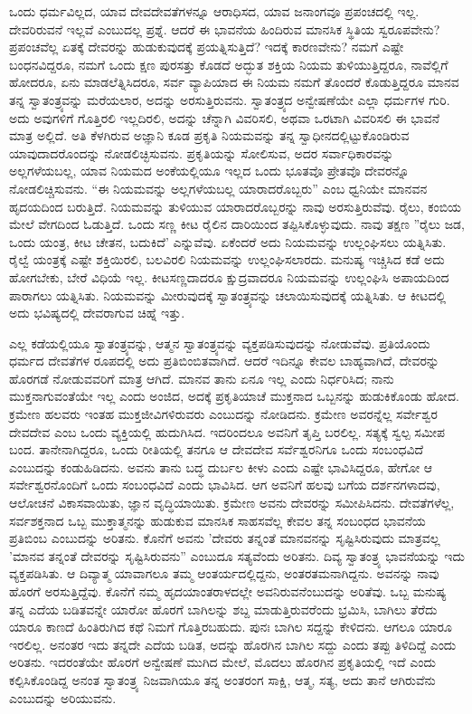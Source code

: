 ಒಂದು ಧರ್ಮವಿಲ್ಲದ, ಯಾವ ದೇವದೇವತೆಗಳನ್ನೂ ಆರಾಧಿಸದ, ಯಾವ ಜನಾಂಗವೂ ಪ್ರಪಂಚದಲ್ಲಿ ಇಲ್ಲ. ದೇವರಿರುವನೆ ಇಲ್ಲವೆ ಎಂಬುದಲ್ಲ ಪ್ರಶ್ನೆ. ಆದರೆ ಈ ಭಾವನೆಯ ಹಿಂದಿರುವ ಮಾನಸಿಕ ಸ್ಥಿತಿಯ ಸ್ವರೂಪವೇನು? ಪ್ರಪಂಚವೆಲ್ಲ ಏತಕ್ಕೆ ದೇವರನ್ನು ಹುಡುಕುವುದಕ್ಕೆ ಪ್ರಯತ್ನಿಸುತ್ತಿದೆ? ಇದಕ್ಕೆ ಕಾರಣವೇನು? ನಮಗೆ ಎಷ್ಟೇ ಬಂಧನವಿದ್ದರೂ, ನಮಗೆ ಒಂದು ಕ್ಷಣ ಪುರಸತ್ತು ಕೊಡದೆ ಅದ್ಭುತ ಶಕ್ತಿಯ ನಿಯಮ ತುಳಿಯುತ್ತಿದ್ದರೂ, ನಾವೆಲ್ಲಿಗೆ ಹೋದರೂ, ಏನು ಮಾಡಲೆತ್ನಿಸಿದರೂ, ಸರ್ವ ವ್ಯಾಪಿಯಾದ ಈ ನಿಯಮ ನಮಗೆ ತೊಂದರೆ ಕೊಡುತ್ತಿದ್ದರೂ ಮಾನವ ತನ್ನ ಸ್ವಾತಂತ್ರ್ಯವನ್ನು ಮರೆಯಲಾರ, ಅದನ್ನು ಅರಸುತ್ತಿರುವನು. ಸ್ವಾತಂತ್ರ್ಯದ ಅನ್ವೇಷಣೆಯೇ ಎಲ್ಲಾ ಧರ್ಮಗಳ ಗುರಿ. ಅದು ಅವುಗಳಿಗೆ ಗೊತ್ತಿರಲಿ ಇಲ್ಲದಿರಲಿ, ಅದನ್ನು ಚೆನ್ನಾಗಿ ವಿವರಿಸಲಿ, ಅಥವಾ ಒರಟಾಗಿ ವಿವರಿಸಲಿ ಈ ಭಾವನೆ ಮಾತ್ರ ಅಲ್ಲಿದೆ. ಅತಿ ಕೆಳಗಿರುವ ಅಜ್ಞಾನಿ ಕೂಡ ಪ್ರಕೃತಿ ನಿಯಮವನ್ನು ತನ್ನ ಸ್ವಾಧೀನದಲ್ಲಿಟ್ಟುಕೊಂಡಿರುವ ಯಾವುದಾದರೊಂದನ್ನು ನೋಡಲಿಚ್ಛಿಸುವನು. ಪ್ರಕೃತಿಯನ್ನು ಸೋಲಿಸುವ, ಅದರ ಸರ್ವಾಧಿಕಾರವನ್ನು ಅಲ್ಲಗಳೆಯಬಲ್ಲ, ಯಾವ ನಿಯಮದ ಅಂಕೆಯಲ್ಲಿಯೂ ಇಲ್ಲದ ಒಂದು ಭೂತವೊ ಪ್ರೇತವೊ ದೇವರನ್ನೊ ನೋಡಲಿಚ್ಚಿಸುವನು. “ಈ ನಿಯಮವನ್ನು ಅಲ್ಲಗಳೆಯಬಲ್ಲ ಯಾರಾದರೊಬ್ಬರು” ಎಂಬ ಧ್ವನಿಯೇ ಮಾನವನ ಹೃದಯದಿಂದ ಬರುತ್ತಿದೆ. ನಿಯಮವನ್ನು ತುಳಿಯುವ ಯಾರಾದರೊಬ್ಬರನ್ನು ನಾವು ಅರಸುತ್ತಿರುವೆವು. ರೈಲು, ಕಂಬಿಯ ಮೇಲೆ ವೇಗದಿಂದ ಓಡುತ್ತಿದೆ. ಒಂದು ಸಣ್ಣ ಕೀಟ ರೈಲಿನ ದಾರಿಯಿಂದ ತಪ್ಪಿಸಿಕೊಳ್ಳುವುದು. ನಾವು ತಕ್ಷಣ ''ರೈಲು ಜಡ, ಒಂದು ಯಂತ್ರ, ಕೀಟ ಚೇತನ, ಬದುಕಿದೆ' ಎನ್ನುವೆವು. ಏಕೆಂದರೆ ಅದು ನಿಯಮವನ್ನು ಉಲ್ಲಂಘಿಸಲು ಯತ್ನಿಸಿತು. ರೈಲ್ವೆ ಯಂತ್ರಕ್ಕೆ ಎಷ್ಟೇ ಶಕ್ತಿಯಿರಲಿ, ಬಲವಿರಲಿ ನಿಯಮವನ್ನು ಉಲ್ಲಂಘಿಸಲಾರದು. ಮನುಷ್ಯ ಇಚ್ಚಿಸಿದ ಕಡೆ ಅದು ಹೋಗಬೇಕು, ಬೇರೆ ವಿಧಿಯೆ ಇಲ್ಲ. ಕೀಟಸಣ್ಣದಾದರೂ ಕ್ಷುದ್ರವಾದರೂ ನಿಯಮವನ್ನು ಉಲ್ಲಂಘಿಸಿ ಅಪಾಯದಿಂದ ಪಾರಾಗಲು ಯತ್ನಿಸಿತು. ನಿಯಮವನ್ನು ಮೀರುವುದಕ್ಕೆ ಸ್ವಾತಂತ್ರ್ಯವನ್ನು ಚಲಾಯಿಸುವುದಕ್ಕೆ ಯತ್ನಿಸಿತು. ಆ ಕೀಟದಲ್ಲಿ ಅದು ಭವಿಷ್ಯದಲ್ಲಿ ದೇವರಾಗುವ ಚಿಹ್ನೆ ಇತ್ತು.

ಎಲ್ಲ ಕಡೆಯಲ್ಲಿಯೂ ಸ್ವಾತಂತ್ರ್ಯವನ್ನು, ಆತ್ಮನ ಸ್ವಾತಂತ್ರ್ಯವನ್ನು ವ್ಯಕ್ತಪಡಿಸುವುದನ್ನು ನೋಡುವೆವು. ಪ್ರತಿಯೊಂದು ಧರ್ಮದ ದೇವತೆಗಳ ರೂಪದಲ್ಲಿ ಅದು ಪ್ರತಿಬಿಂಬಿತವಾಗಿದೆ. ಆದರೆ ಇದಿನ್ನೂ ಕೇವಲ ಬಾಹ್ಯವಾಗಿದೆ, ದೇವರನ್ನು ಹೊರಗಡೆ ನೋಡುವವರಿಗೆ ಮಾತ್ರ ಆಗಿದೆ. ಮಾನವ ತಾನು ಏನೂ ಇಲ್ಲ ಎಂದು ನಿರ್ಧರಿಸಿದ; ನಾನು ಮುಕ್ತನಾಗುವಂತೆಯೇ ಇಲ್ಲ ಎಂದು ಅಂಜಿದ, ಅದಕ್ಕೆ ಪ್ರಕೃತಿಯಾಚೆ ಮುಕ್ತನಾದ ಒಬ್ಬನನ್ನು ಹುಡುಕಿಕೊಂಡು ಹೋದ. ಕ್ರಮೇಣ ಹಲವರು ಇಂತಹ ಮುಕ್ತಜೀವಿಗಳಿರುವರು ಎಂಬುದನ್ನು ನೋಡಿದನು. ಕ್ರಮೇಣ ಅವರನ್ನೆಲ್ಲ ಸರ್ವೇಶ್ವರ ದೇವದೇವ ಎಂಬ ಒಂದು ವ್ಯಕ್ತಿಯಲ್ಲಿ ಹುದುಗಿಸಿದ. ಇದರಿಂದಲೂ ಅವನಿಗೆ ತೃಪ್ತಿ ಬರಲಿಲ್ಲ. ಸತ್ಯಕ್ಕೆ ಸ್ವಲ್ಪ ಸಮೀಪ ಬಂದ. ತಾನೇನಾಗಿದ್ದರೂ, ಒಂದು ರೀತಿಯಲ್ಲಿ ತನಗೂ ಆ ದೇವದೇವ ಸರ್ವೆಶ್ವರನಿಗೂ ಒಂದು ಸಂಬಂಧವಿದೆ ಎಂಬುದನ್ನು ಕಂಡುಹಿಡಿದನು. ಅವನು ತಾನು ಬದ್ಧ ದುರ್ಬಲ ಕೀಳು ಎಂದು ಎಷ್ಟೇ ಭಾವಿಸಿದ್ದರೂ, ಹೇಗೋ ಆ ಸರ್ವೇಶ್ವರನೊಂದಿಗೆ ಒಂದು ಸಂಬಂಧವಿದೆ ಎಂದು ಭಾವಿಸಿದ. ಆಗ ಅವನಿಗೆ ಹಲವು ಬಗೆಯ ದರ್ಶನಗಳಾದವು, ಆಲೋಚನೆ ವಿಕಾಸವಾಯಿತು, ಜ್ಞಾನ ವೃದ್ಧಿಯಾಯಿತು. ಕ್ರಮೇಣ ಅವನು ದೇವರನ್ನು ಸಮೀಪಿಸಿದನು. ದೇವತೆಗಳೆಲ್ಲ, ಸರ್ವಶಕ್ತನಾದ ಒಬ್ಬ ಮುಕ್ತಾತ್ಮನನ್ನು ಹುಡುಕುವ ಮಾನಸಿಕ ಸಾಹಸವೆಲ್ಲ ಕೇವಲ ತನ್ನ ಸಂಬಂಧದ ಭಾವನೆಯ ಪ್ರತಿಬಿಂಬ ಎಂಬುದನ್ನು ಅರಿತನು. ಕೊನೆಗೆ ಅವನು 'ದೇವರು ತನ್ನಂತೆ ಮಾನವನನ್ನು ಸೃಷ್ಟಿಸಿರುವುದು ಮಾತ್ರವಲ್ಲ 'ಮಾನವ ತನ್ನಂತೆ ದೇವರನ್ನು ಸೃಷ್ಟಿಸಿರುವನು” ಎಂಬುದೂ ಸತ್ಯವೆಂದು ಅರಿತನು. ದಿವ್ಯ ಸ್ವಾತಂತ್ರ್ಯ ಭಾವನೆಯನ್ನು ಇದು ವ್ಯಕ್ತಪಡಿಸಿತು. ಆ ದಿವ್ಯಾತ್ಮ ಯಾವಾಗಲೂ ತಮ್ಮ ಆಂತರ್ಯದಲ್ಲಿದ್ದನು, ಅಂತರತಮನಾಗಿದ್ದನು. ಅವನನ್ನು ನಾವು ಹೊರಗೆ ಅರಸುತ್ತಿದ್ದೆವು. ಕೊನೆಗೆ ನಮ್ಮ ಹೃದಯಾಂತರಾಳದಲ್ಲೇ ಅವನಿರುವನೆಂಬುದನ್ನು ಅರಿತೆವು. ಒಬ್ಬ ಮನುಷ್ಯ ತನ್ನ ಎದೆಯ ಬಡಿತವನ್ನೇ ಯಾರೋ ಹೊರಗೆ ಬಾಗಿಲನ್ನು ಶಬ್ದ ಮಾಡುತ್ತಿರುವರೆಂದು ಭ್ರಮಿಸಿ, ಬಾಗಿಲು ತೆರೆದು ಯಾರೂ ಕಾಣದೆ ಹಿಂತಿರುಗಿದ ಕಥೆ ನಿಮಗೆ ಗೊತ್ತಿರಬಹುದು. ಪುನಃ ಬಾಗಿಲ ಸದ್ದನ್ನು ಕೇಳಿದನು. ಆಗಲೂ ಯಾರೂ ಇರಲಿಲ್ಲ. ಅನಂತರ ಇದು ತನ್ನದೇ ಎದೆಯ ಬಡಿತ, ಅದನ್ನು ಹೊರಗಿನ ಬಾಗಿಲ ಸದ್ದು ಎಂದು ತಪ್ಪು ತಿಳಿದಿದ್ದೆ ಎಂದು ಅರಿತನು. ಇದರಂತೆಯೇ ಹೊರಗೆ ಅನ್ವೇಷಣೆ ಮುಗಿದ ಮೇಲೆ, ಮೊದಲು ಹೊರಗಿನ ಪ್ರಕೃತಿಯಲ್ಲಿ ಇದೆ ಎಂದು ಕಲ್ಪಿಸಿಕೊಂಡಿದ್ದ ಅನಂತ ಸ್ವಾತಂತ್ರ್ಯ ನಿಜವಾಗಿಯೂ ತನ್ನ ಅಂತರಂಗ ಸಾಕ್ಷಿ, ಆತ್ಮ, ಸತ್ಯ, ಅದು ತಾನೆ ಆಗಿರುವೆನು ಎಂಬುದನ್ನು ಅರಿಯುವನು.

